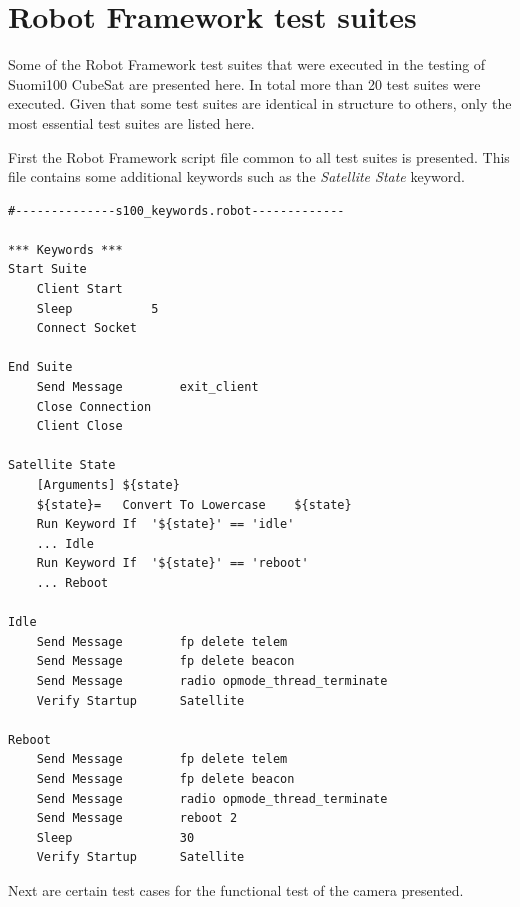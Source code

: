 \documentclass[english,12pt,a4paper,pdftex,elec,utf8]{aaltothesis}
\begin{document}
\section{Robot Framework test suites\label{LiiteB}}
Some of the Robot Framework test suites that were executed in the testing of Suomi100 CubeSat are presented here. In total more than 20 test suites were executed. Given that some test suites are identical in structure to others, only the most essential test suites are listed here.\par
First the Robot Framework script file common to all test suites is presented. This file contains some additional keywords such as the \textit{Satellite State} keyword.
\begin{verbatim}
#--------------s100_keywords.robot-------------

*** Keywords ***
Start Suite
	Client Start
	Sleep			5
	Connect Socket
	
End Suite
	Send Message		exit_client
	Close Connection	
	Client Close
		
Satellite State
	[Arguments]	${state}
	${state}=	Convert To Lowercase	${state}
	Run Keyword If	'${state}' == 'idle'
	...	Idle
	Run Keyword If	'${state}' == 'reboot'
	...	Reboot
	
Idle
	Send Message		fp delete telem
	Send Message		fp delete beacon
	Send Message		radio opmode_thread_terminate
	Verify Startup		Satellite

Reboot
	Send Message		fp delete telem
	Send Message		fp delete beacon
	Send Message		radio opmode_thread_terminate
	Send Message		reboot 2
	Sleep				30
	Verify Startup		Satellite

\end{verbatim} 
Next are certain test cases for the functional test of the camera presented.
\end{document}

